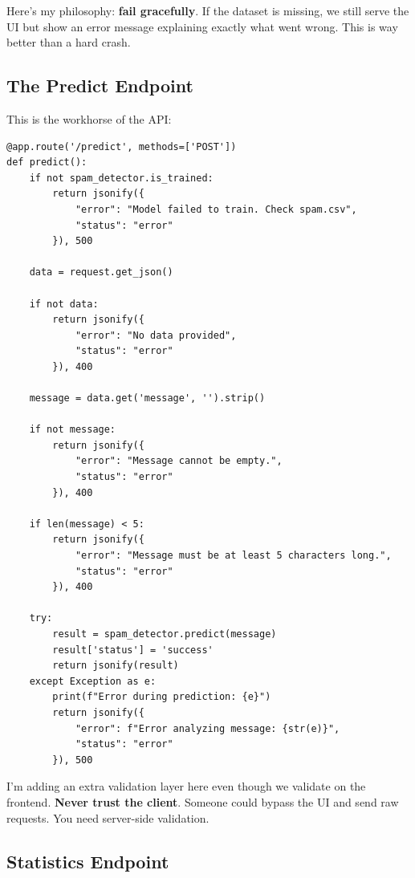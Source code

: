 \documentclass[12pt, a4paper]{article}
\begin{document}
Here's my philosophy: \textbf{fail gracefully}. If the dataset is missing, we still serve the UI but show an error message explaining exactly what went wrong. This is way better than a hard crash.

\subsection{The Predict Endpoint}

This is the workhorse of the API:

\begin{verbatim}
@app.route('/predict', methods=['POST'])
def predict():
    if not spam_detector.is_trained:
        return jsonify({
            "error": "Model failed to train. Check spam.csv",
            "status": "error"
        }), 500
    
    data = request.get_json()
    
    if not data:
        return jsonify({
            "error": "No data provided",
            "status": "error"
        }), 400
    
    message = data.get('message', '').strip()
    
    if not message:
        return jsonify({
            "error": "Message cannot be empty.",
            "status": "error"
        }), 400
    
    if len(message) < 5:
        return jsonify({
            "error": "Message must be at least 5 characters long.",
            "status": "error"
        }), 400
    
    try:
        result = spam_detector.predict(message)
        result['status'] = 'success'
        return jsonify(result)
    except Exception as e:
        print(f"Error during prediction: {e}")
        return jsonify({
            "error": f"Error analyzing message: {str(e)}",
            "status": "error"
        }), 500
\end{verbatim}

\begin{techdetail}
    I'm adding an extra validation layer here even though we validate on the frontend. \textbf{Never trust the client}. Someone could bypass the UI and send raw requests. You need server-side validation.
\end{techdetail}

\subsection{Statistics Endpoint}
\end{document}
